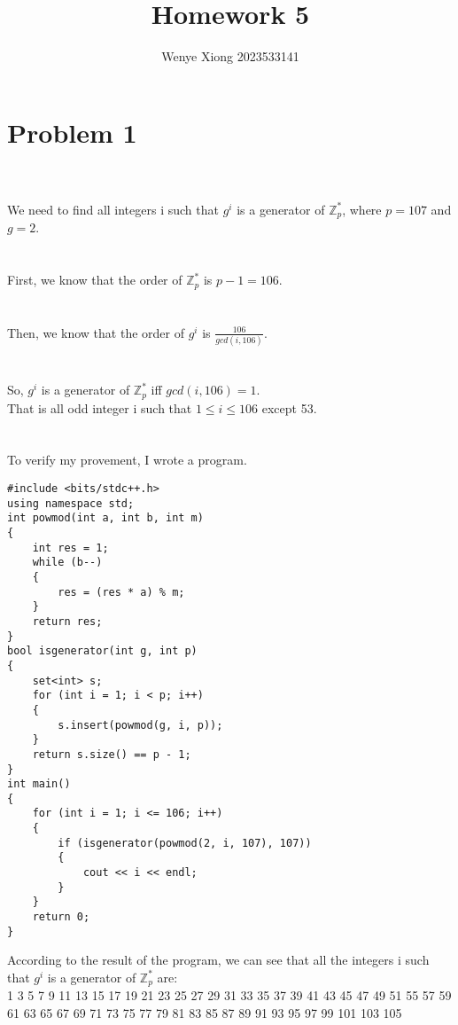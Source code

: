 \documentclass{article}
\author{Wenye Xiong 2023533141}
\title{Homework 5}
\begin{document}
\maketitle
\section{Problem 1}
\\ \hspace*{\fill} \\
We need to find all integers i such that $g^i$ is a generator of $\mathbb{Z}_p^*$, where $p = 107$ and $g = 2$.\\
\\ \hspace*{\fill} \\
First, we know that the order of $\mathbb{Z}_p^*$ is $p-1 = 106$.\\
\\ \hspace*{\fill} \\
Then, we know that the order of $g^i$ is $\frac{106}{gcd(i, 106)}$.\\
\\ \hspace*{\fill} \\
So, $g^i$ is a generator of $\mathbb{Z}_p^*$ iff $gcd(i, 106) = 1$.\\
That is all odd integer i such that $1 \leq i \leq 106$ except 53.\\
\\ \hspace*{\fill} \\
To verify my provement, I wrote a program.\\
\begin{lstlisting}
#include <bits/stdc++.h>
using namespace std;
int powmod(int a, int b, int m)
{
    int res = 1;
    while (b--)
    {
        res = (res * a) % m;
    }
    return res;
}
bool isgenerator(int g, int p)
{
    set<int> s;
    for (int i = 1; i < p; i++)
    {
        s.insert(powmod(g, i, p));
    }
    return s.size() == p - 1;
}
int main()
{
    for (int i = 1; i <= 106; i++)
    {
        if (isgenerator(powmod(2, i, 107), 107))
        {
            cout << i << endl;
        }
    }
    return 0;
}
\end{lstlisting}

According to the result of the program, we can see that all the integers i such that $g^i$ is a generator of $\mathbb{Z}_p^*$ are:\\
1 3 5 7 9 11 13 15 17 19 21 23 25 27 29 31 33 35 37 39 41 43 45 47 49 51 55 57 59 61 63 65 67 69 71 73 75 77 79 81 83 85 87 89 91 93 95 97 99 101 103 105\\
\\ \hspace*{\fill} \\
\newpage
\end{document}
